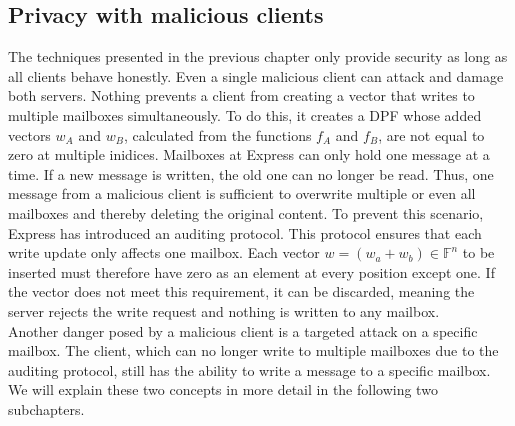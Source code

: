 \documentclass[a4paper]{article}
\begin{document}
\subsection{Privacy with malicious clients}
The techniques presented in the previous chapter only provide security as long as all clients behave honestly. Even a single malicious client can attack and damage both servers. Nothing prevents a client from creating a vector that writes to multiple mailboxes simultaneously. To do this, it creates a DPF whose added vectors $w_A$ and $w_B$, calculated from the functions $f_A$ and $f_B$, are not equal to zero at multiple inidices. Mailboxes at Express can only hold one message at a time. If a new message is written, the old one can no longer be read. Thus, one message from a malicious client is sufficient to overwrite multiple or even all mailboxes and thereby deleting the original content. To prevent this scenario, Express has introduced an auditing protocol. This protocol ensures that each write update only affects one mailbox. Each vector $w = (w_a + w_b) \in \mathbb{F}^n$ to be inserted must therefore have zero as an element at every position except one. If the vector does not meet this requirement, it can be discarded, meaning the server rejects the write request and nothing is written to any mailbox. \\
Another danger posed by a malicious client is a targeted attack on a specific mailbox. The client, which can no longer write to multiple mailboxes due to the auditing protocol, still has the ability to write a message to a specific mailbox.
We will explain these two concepts in more detail in the following two subchapters. 
\end{document}
